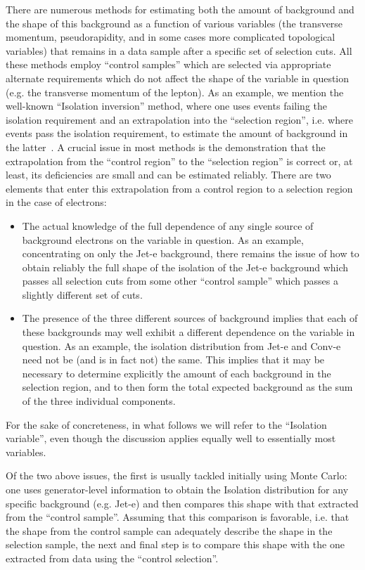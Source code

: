 There are numerous methods for estimating both the amount of background and the shape of this background as a function of various variables (the transverse momentum, pseudorapidity, and in some cases more complicated topological variables) that remains in a data sample after a specific set of selection cuts.  All these methods employ ``control samples'' which are selected via appropriate alternate requirements which do not affect the shape of the variable in question (e.g. the transverse momentum of the lepton).  As an example, we mention the well-known ``Isolation inversion'' method, where one uses events failing the isolation requirement and an extrapolation into the ``selection region'', i.e. where events pass the isolation requirement, to estimate the amount of background in the latter~\cite{cornel}.  A crucial issue in most methods is the demonstration that the extrapolation from the ``control region'' to the ``selection region'' is correct or, at least, its deficiencies are small and can be estimated reliably.  There are two elements that enter this extrapolation from a control region to a selection region in the case of electrons:
\begin{itemize}
\item The actual knowledge of the full dependence of any single source of background electrons on the variable in question.  As an example, concentrating on only the Jet-e background, there remains the issue of how to obtain reliably the full shape of the isolation of the Jet-e background which passes all selection cuts from some other ``control sample'' which passes a slightly different set of cuts.
\item The presence of the three different sources of background implies that each of these backgrounds may well exhibit a different dependence on the variable in question.  As an example, the isolation distribution from Jet-e and Conv-e need not be (and is in fact not) the same.  This implies that it may be necessary to determine explicitly the amount of each background in the selection region, and to then form the total expected background as the sum of the three individual components.
\end{itemize}
For the sake of concreteness, in what follows we will refer to the ``Isolation variable'', even though the discussion applies equally well to essentially most variables.

Of the two above issues, the first is usually tackled initially using Monte Carlo: one uses generator-level information to obtain the Isolation distribution for any specific background (e.g. Jet-e) and then compares this shape with that extracted from the ``control sample''.  Assuming that this comparison is favorable, i.e. that the shape from the control sample can adequately describe the shape in the selection sample, the next and final step is to compare this shape with the one extracted from data using the ``control selection''. 

